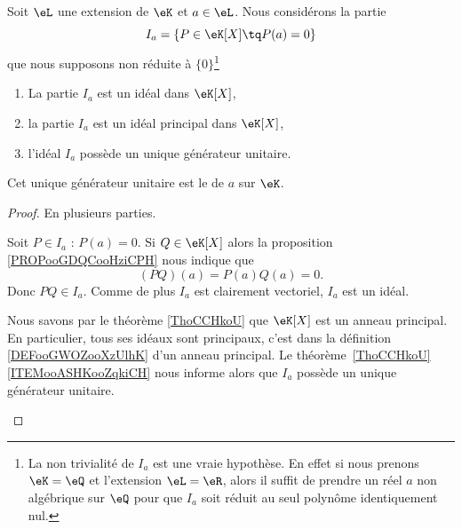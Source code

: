 \begin{lemmaDef}    \label{DefCVMooFGSAgL}
	Soit \( \eL\) une extension de \( \eK\) et \( a\in \eL\). Nous considérons la partie
	\begin{equation}
		I_a=\{ P\in \eK[X]\tq P(a)=0 \}
	\end{equation}
	que nous supposons non réduite à \( \{ 0 \}\)\footnote{La non trivialité de \( I_a\) est une vraie hypothèse. En effet si nous prenons \( \eK=\eQ\) et l'extension \( \eL=\eR\), alors il suffit de prendre un réel \( a\) non algébrique sur \( \eQ\) pour que \( I_a\) soit réduit au seul polynôme identiquement nul.}

	\begin{enumerate}
		\item       \label{ITEMooUNLCooIfYZry}
		      La partie \( I_a\) est un idéal dans \( \eK[X]\),
		\item       \label{ITEMooDCDRooPDnnbu}
		      la partie \( I_a\) est un idéal principal dans \( \eK[X]\),
		\item       \label{ITEMooXFYQooTuMzIu}
		      l'idéal \( I_a\) possède un unique générateur unitaire.
	\end{enumerate}

	Cet unique générateur unitaire est le  de \( a\) sur \( \eK\).
\end{lemmaDef}

\begin{proof}
	En plusieurs parties.
	\begin{subproof}
		Soit \( P\in I_a\) : \( P(a)=0\). Si \( Q\in \eK[X]\) alors la proposition \ref{PROPooGDQCooHziCPH} nous indique que
		\begin{equation}
			(PQ)(a)=P(a)Q(a)=0.
		\end{equation}
		Donc \( PQ\in I_a\). Comme de plus \( I_a\) est clairement vectoriel, \( I_a\) est un idéal.

		Nous savons par le théorème \ref{ThoCCHkoU} que \( \eK[X]\) est un anneau principal. En particulier, tous ses idéaux sont principaux, c'est dans la définition \ref{DEFooGWOZooXzUlhK} d'un anneau principal.
		Le théorème~\ref{ThoCCHkoU}\ref{ITEMooASHKooZqkiCH} nous informe alors que \( I_a\) possède un unique générateur unitaire.
	\end{subproof}
\end{proof}

